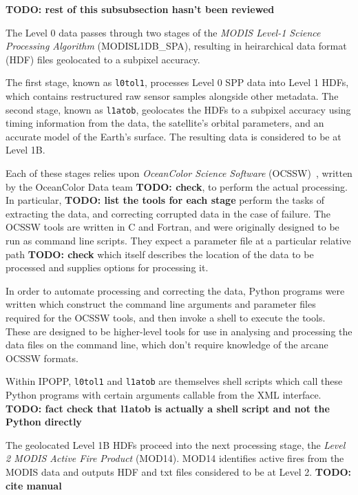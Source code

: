 \textbf{TODO: rest of this subsubsection hasn't been reviewed}

The Level 0 data passes through two stages of the \textit{MODIS Level-1 Science Processing Algorithm} (MODISL1DB\_SPA), resulting in heirarchical data format (HDF) files geolocated to a subpixel accuracy.

The first stage, known as \texttt{l0tol1}, processes Level 0 SPP data into Level 1 HDFs, which contains restructured raw sensor samples alongside other metadata.
The second stage, known as \texttt{l1atob}, geolocates the HDFs to a subpixel accuracy using timing information from the data, the satellite's orbital parameters, and an accurate model of the Earth's surface.
The resulting data is considered to be at Level 1B.

Each of these stages relies upon \textit{OceanColor Science Software} (OCSSW)~\cite{ocssw}, written by the OceanColor Data team \textbf{TODO: check}, to perform the actual processing.
In particular, \textbf{TODO: list the tools for each stage} perform the tasks of extracting the data, and correcting corrupted data in the case of failure.
The OCSSW tools are written in C and Fortran, and were originally designed to be run as command line scripts.
They expect a parameter file at a particular relative path \textbf{TODO: check} which itself describes the location of the data to be processed and supplies options for processing it.

In order to automate processing and correcting the data, Python programs were written which construct the command line arguments and parameter files required for the OCSSW tools, and then invoke a shell to execute the tools.
These are designed to be higher-level tools for use in analysing and processing the data files on the command line, which don't require knowledge of the arcane OCSSW formats.

Within IPOPP, \texttt{l0tol1} and \texttt{l1atob} are themselves shell scripts which call these Python programs with certain arguments callable from the XML interface.
\textbf{TODO: fact check that l1atob is actually a shell script and not the Python directly}

The geolocated Level 1B HDFs proceed into the next processing stage, the \textit{Level 2 MODIS Active Fire Product} (MOD14).
MOD14 identifies active fires from the MODIS data and outputs HDF and txt files considered to be at Level 2. \textbf{TODO: cite manual}

